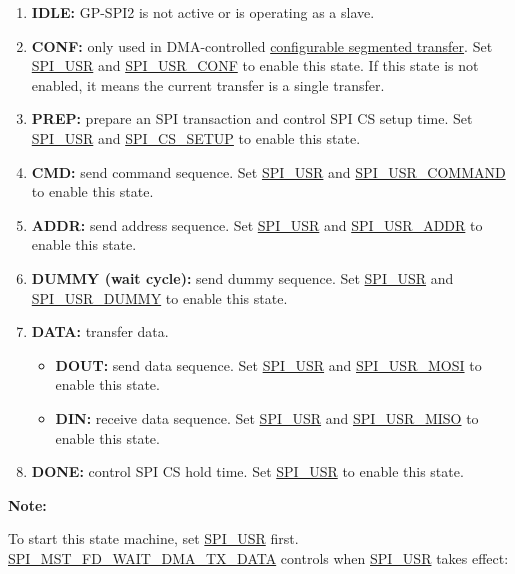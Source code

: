 \documentclass[main\_\_EN.tex]{subfiles}
\begin{document}
\begin{enumerate}
    \item \textbf{IDLE:} GP-SPI2 is not active or is operating as a slave.
    \item \textbf{CONF:} only used in DMA-controlled \hyperref[sec:gp-spi-dma-seg-conf-trans]{configurable segmented transfer}. Set \hyperref[fielddesc:SPIUSR]{SPI\_USR} and \hyperref[fielddesc:SPIUSRCONF]{SPI\_USR\_CONF} to enable this state. If this state is not enabled, it means the current transfer is a single transfer. 
    \item \textbf{PREP:} prepare an SPI transaction and control SPI CS setup time. Set \hyperref[fielddesc:SPIUSR]{SPI\_USR} and \hyperref[fielddesc:SPICSSETUP]{SPI\_CS\_SETUP} to enable this state. 
    \item\label{phase:cmd} \textbf{CMD:} send command sequence. Set \hyperref[fielddesc:SPIUSR]{SPI\_USR} and \hyperref[fielddesc:SPIUSRCOMMAND]{SPI\_USR\_COMMAND} to enable this state. 
    \item\label{phase:addr} \textbf{ADDR:} send address sequence. Set \hyperref[fielddesc:SPIUSR]{SPI\_USR} and \hyperref[fielddesc:SPIUSRADDR]{SPI\_USR\_ADDR} to enable this state. 
    \item \textbf{DUMMY (wait cycle):} send dummy sequence. Set \hyperref[fielddesc:SPIUSR]{SPI\_USR} and \hyperref[fielddesc:SPIUSRDUMMY]{SPI\_USR\_DUMMY} to enable this state. 
    \item\label{phase:data} \textbf{DATA:} transfer data.
    \begin{itemize}
    \item \textbf{DOUT:} send data sequence. Set \hyperref[fielddesc:SPIUSR]{SPI\_USR} and \hyperref[fielddesc:SPIUSRMOSI]{SPI\_USR\_MOSI} to enable this state. 
    \item \textbf{DIN:} receive data sequence. Set \hyperref[fielddesc:SPIUSR]{SPI\_USR} and \hyperref[fielddesc:SPIUSRMISO]{SPI\_USR\_MISO} to enable this state. 
    \end{itemize}
    \item \textbf{DONE:} control SPI CS hold time. Set \hyperref[fielddesc:SPIUSR]{SPI\_USR} to enable this state. 
\end{enumerate}

\textbf{Note:}

To start this state machine, set \hyperref[fielddesc:SPIUSR]{SPI\_USR} first. \hyperref[fielddesc:SPIMSTFDWAITDMATXDATA]{SPI\_MST\_FD\_WAIT\_DMA\_TX\_DATA} controls when \hyperref[fielddesc:SPIUSR]{SPI\_USR} takes effect:
\end{document}
